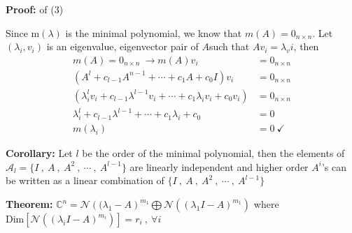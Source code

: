\documentclass[twoside]{article}
\begin{document}
\textbf{Proof:} of (3) 

Since m$(\lambda)$ is the minimal polynomial, we know that $m(A) = 0_{n \times n}$. Let $(\lambda_i , v_i)$ is an eigenvalue, eigenvector pair of $A$such that $A v_i = \lambda_vi$, then
%
\begin{align*}
m(A) = 0_{n \times n} \ \rightarrow m(A) v_i &= 0_{n \times n} 
\\
\left( A^l + c_{l-1} A^{n-1} + \cdots + c_1 A + c_0 I \right) v_i &= 0_{n \times n} 
\\
\left( \lambda_i^l v_i + c_{l-1} \lambda^{l-1} v_i  + \cdots + c_1 \lambda_i v_i + c_0  v_i \right)  &= 0_{n \times n} 
\\
 \lambda_i^l  + c_{l-1} \lambda^{l-1}   + \cdots + c_1 \lambda_i  + c_0   &= 0
 \\
m(\lambda_i)  &= 0 \ \checkmark
\end{align*}

\textbf{Corollary:} Let $l$ be the order of the minimal polynomial, then the elements of $\mathcal{A}_l = \lbrace I \ , \ A \ , \ A^2 \ , \ \cdots \ , \ A^{l-1} \rbrace$ 
are linearly independent and higher order $A^i$'s can be written as a linear combination of $\lbrace I \ , \ A \ , \ A^2 \ , \ \cdots \ , \ A^{l-1} \rbrace$  

\vspace{6pt}

\textbf{Theorem:} $\mathbb{C}^{n} = \mathcal{N}\left( (\lambda_1 - A \right)^{m_1} \bigoplus \mathcal{N}\left( (\lambda_1 I - A )^{m_1} \right) $ where $\mathrm{Dim} \left[  \mathcal{N}\left( (\lambda_i I - A )^{m_i} \right) \right] = r_i \ , \ \forall i$

\end{document}
